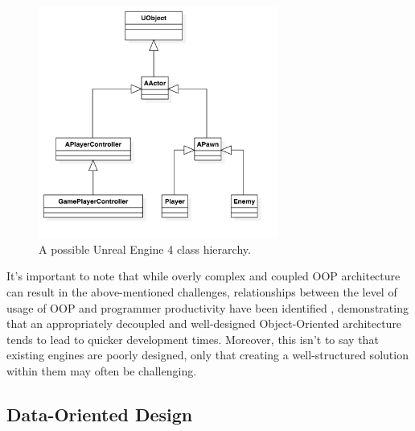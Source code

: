 \documentclass[10pt]{scrartcl}
\begin{document}
	\begin{figure}[H]
		\centering
		\includegraphics[width=0.7\textwidth]{models/ClassDiagram1.png}
		\caption{A possible Unreal Engine 4 class hierarchy.}
		\label{fig:ue4}
	\end{figure}

	It's important to note that while overly complex and coupled OOP architecture can result in the above-mentioned challenges, relationships between the level of usage of OOP and programmer productivity have been identified \parencite{oop-productivity} \parencite{comstock}, demonstrating that an appropriately decoupled and well-designed Object-Oriented architecture tends to lead to quicker development times. Moreover, this isn't to say that existing engines are poorly designed, only that creating a well-structured solution within them may often be challenging.


	\subsection{Data-Oriented Design} %
	\label{sub:data_oriented_design}
\end{document}
